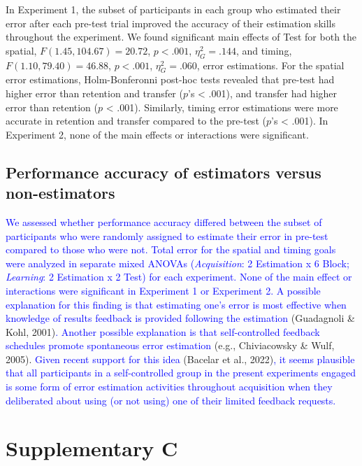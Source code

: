\documentclass[
  doc, donotrepeattitle,floatsintext]{apa7}
\begin{document}
In Experiment 1, the subset of participants in each group who estimated their error after each pre-test trial improved the accuracy of their estimation skills throughout the experiment. We found significant main effects of Test for both the spatial, \(F(1.45,104.67) = 20.72\), \(p < .001\), \(\eta_{G}^2 = .144\), and timing, \(F(1.10,79.40) = 46.88\), \(p < .001\), \(\eta_{G}^2 = .060\), error estimations. For the spatial error estimations, Holm-Bonferonni post-hoc tests revealed that pre-test had higher error than retention and transfer (\(p\)'s \textless{} .001), and transfer had higher error than retention (\(p\) \textless{} .001). Similarly, timing error estimations were more accurate in retention and transfer compared to the pre-test (\(p\)'s \textless{} .001). In Experiment 2, none of the main effects or interactions were significant.

\hypertarget{performance-accuracy-of-estimators-versus-non-estimators}{%
\subsection{Performance accuracy of estimators versus non-estimators}\label{performance-accuracy-of-estimators-versus-non-estimators}}

\textcolor{blue}{We assessed whether performance accuracy differed between the subset of participants who were randomly assigned to estimate their error in pre-test compared to those who were not. Total error for the spatial and timing goals were analyzed in separate mixed ANOVAs (\emph{Acquisition}: 2 Estimation x 6 Block; \emph{Learning}: 2 Estimation x 2 Test) for each experiment. None of the main effect or interactions were significant in Experiment 1 or Experiment 2. A possible explanation for this finding is that estimating one's error is most effective when knowledge of results feedback is provided following the estimation} (Guadagnoli \& Kohl, 2001)\textcolor{blue}{. Another possible explanation is that self-controlled feedback schedules promote spontaneous error estimation} (e.g., Chiviacowsky \& Wulf, 2005). \textcolor{blue}{Given recent support for this idea} (Bacelar et al., 2022)\textcolor{blue}{, it seems plausible that all participants in a self-controlled group in the present experiments engaged is some form of error estimation activities throughout acquisition when they deliberated about using (or not using) one of their limited feedback requests.}

\clearpage

\hypertarget{supplementary-c}{%
\section{Supplementary C}\label{supplementary-c}}
\end{document}

